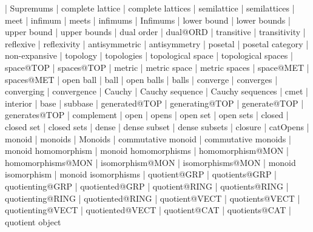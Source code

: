     |   Supremums
    |   complete lattice
    |   complete lattices
    |   semilattice
    |   semilattices
    |   meet
    |   infimum
    |   meets
    |   infimums
    |   Infimums
    |   lower bound
    |   lower bounds
    |   upper bound
    |   upper bounds
    |   dual order
    |   dual@ORD
    |   transitive
    |   transitivity
    |   reflexive
    |   reflexivity
    |   antisymmetric
    |   antisymmetry
    |   posetal
    |   posetal category
    |   non-expansive
    |   topology
    |   topologies
    |   topological space
    |   topological spaces
    |   space@TOP
    |   spaces@TOP
    |   metric
    |   metric space
    |   metric spaces
    |   space@MET
    |   spaces@MET
    |   open ball
    |   ball
    |   open balls
    |   balls
    |   converge
    |   converges
    |   converging
    |   convergence
    |   Cauchy
    |   Cauchy sequence
    |   Cauchy sequences
    |   cmet
    |   interior
    |   base
    |   subbase
    |   generated@TOP
    |   generating@TOP
    |   generate@TOP
    |   generates@TOP
    |   complement
    |   open
    |   opens
    |   open set
    |   open sets
    |   closed
    |   closed set
    |   closed sets
    |   dense
    |   dense subset
    |   dense subsets
    |   closure
    |   catOpens
    |   monoid
    |   monoids
    |   Monoids
    |   commutative monoid
    |   commutative monoids
    |   monoid homomorphism
    |   monoid homomorphisms
    |   homomorphism@MON
    |   homomorphisms@MON
    |   isomorphism@MON
    |   isomorphisms@MON
    |   monoid isomorphism
    |   monoid isomorphisms
    |   quotient@GRP
    |   quotients@GRP
    |   quotienting@GRP
    |   quotiented@GRP
    |   quotient@RING
    |   quotients@RING
    |   quotienting@RING
    |   quotiented@RING
    |   quotient@VECT
    |   quotients@VECT
    |   quotienting@VECT
    |   quotiented@VECT
    |   quotient@CAT
    |   quotients@CAT
    |   quotient object
